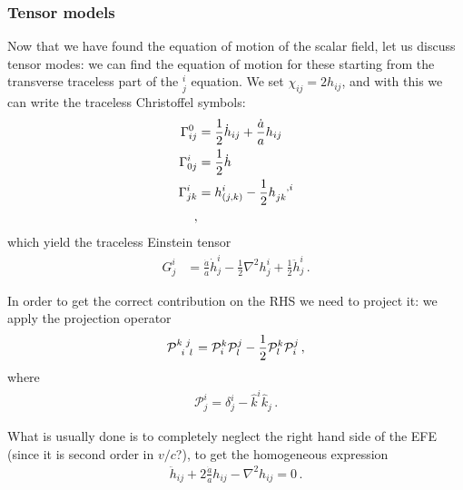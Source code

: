 \documentclass[main.tex]{subfiles}
\begin{document}
\subsubsection{Tensor models}

Now that we have found the equation of motion of the scalar field, let us discuss tensor modes: we can find the equation of motion for these starting from the transverse traceless part of the \(^i_{j}\) equation. We set \(\chi_{ij} = 2 h_{ij}\), and with this we can write the traceless Christoffel symbols:
%
\begin{subequations}
\begin{align}
\Gamma^{0}_{ij} &= \frac{1}{2} \dot{h}_{ij} + \frac{\dot{a}}{a} h_{ij}  \\
\Gamma^{i}_{0j} &= \frac{1}{2} \dot{h}  \\
\Gamma^{i}_{jk} &= h^{i}_{(j,k)} - \frac{1}{2} \tensor{h}{_{jk}^{,i}}  \\
\,,
\end{align}
\end{subequations}
%
which yield the traceless Einstein tensor 
%
\begin{align}
G^{i}_{j} &= \frac{\dot{a}}{a} \dot{h}^{i}_{j} 
- \frac{1}{2} \nabla^2 h^{i}_{j} + \frac{1}{2} \ddot{h}^{i}_{j}
\,.
\end{align}

In order to get the correct contribution on the RHS we need to project it: we apply the projection operator 
%
\begin{align}
\tensor{\mathcal{P}}{^{k}_{i}^{j}_{l}} =
\mathcal{P}^{k}_{i} \mathcal{P}^{j}_{l}
- \frac{1}{2} \mathcal{P}^{k}_{l} \mathcal{P}^{j}_{i}
\,,
\end{align}
%
where 
%
\begin{align}
\mathcal{P}^{i}_{j} = \delta^{i}_{j} - \hat{k}^{i}\hat{k}_{j}
\,.
\end{align}


What is usually done is to completely neglect the right hand side of the EFE (since it is second order in \(v/c\)?), to get the homogeneous expression 
%
\begin{align}
\ddot{h}_{ij} + 2 \frac{\dot{a}}{a} h_{ij} - \nabla^2 h_{ij} = 0
\,.
\end{align}
\end{document}
